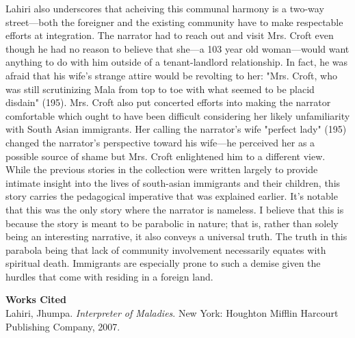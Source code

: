 \documentclass[12pt]{article}
\begin{document}
Lahiri also underscores that acheiving this communal harmony is a two-way street---both the foreigner
and the existing community have to make respectable efforts at integration. The narrator had to reach out
and visit Mrs. Croft even though he had no reason to believe that she---a 103 year old woman---would want
anything to do with him outside of a tenant-landlord relationship. In fact, he was afraid that his wife's
strange attire would be revolting to her: "Mrs. Croft, who was still scrutinizing Mala from top to toe with what seemed to be placid disdain" (195). Mrs. Croft
also put concerted efforts into making the narrator comfortable which ought to have
been difficult considering her likely unfamiliarity with South Asian immigrants. Her calling the narrator's wife 
"perfect lady" (195) changed the narrator's perspective toward his wife---he perceived her
as a possible source of shame but Mrs. Croft enlightened him to a different view. \\

While the previous stories in the collection were written largely to provide intimate insight into the lives of
south-asian immigrants and their children, this story carries the pedagogical imperative that
was explained earlier. It's notable that this was the only story where the narrator is nameless.
I believe that this is because the story is meant to be parabolic in nature; that is, rather than
solely being an interesting narrative, it also conveys a universal truth. The truth in this parabola being 
that lack of community involvement necessarily equates with spiritual death. 
Immigrants are especially prone to such a demise given the hurdles that come with residing in a foreign land. \\

\begin{center}
\textbf{Works Cited} \\
Lahiri, Jhumpa. \textit{Interpreter of Maladies}. New York: Houghton Mifflin Harcourt Publishing Company, 2007.
\end{center}
\end{document}
